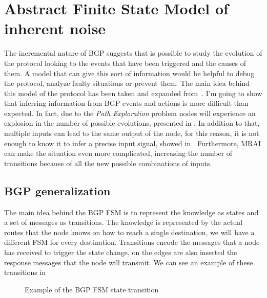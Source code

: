 \chapter{Abstract Finite State Model of inherent noise}
\label{cha:bgp_fsm}


The incremental nature of \ac{BGP} suggests that is possible to study the
evolution of the protocol looking to the events that have been triggered
and the causes of them.
A model that can give this sort of information would be helpful to debug
the protocol, analyze faulty situations or prevent them.
The main idea behind this model of the protocol has been taken and
expanded from~\cite{griffinFSM}.
I'm going to show that inferring information from \ac{BGP} events and actions
is more difficult than expected.
In fact, due to the \textit{Path Exploration} problem
nodes will experience an explosion in the number of possible evolutions,
presented in .
In addition to that, multiple inputs can lead to the same output of the node,
for this reason, it is not enough to know it to infer a precise input signal,
showed in .
Furthermore, \ac{MRAI} can make the situation even more complicated, increasing
the number of transitions because of all the new possible combinations of
inputs.

\section{BGP generalization}
\label{sec:bgp_generalization}

The main idea behind the \ac{BGP} \ac{FSM} is to represent the knowledge as
states and a set of messages as transitions.
The knowledge is represented by the actual routes that the node knows on how
to reach a single destination, we will have a different \ac{FSM} for every
destination.
Transitions encode the messages that a node has received to trigger the state change,
on the edges are also inserted the response messages that the node will transmit.
We can see an example of these transitions in 

\begin{figure}[h]
    \begin{center}
        
    \end{center}
	\caption{Example of the \ac{BGP} \ac{FSM} state transition}
    \label{fig:fsm_example}
\end{figure}

